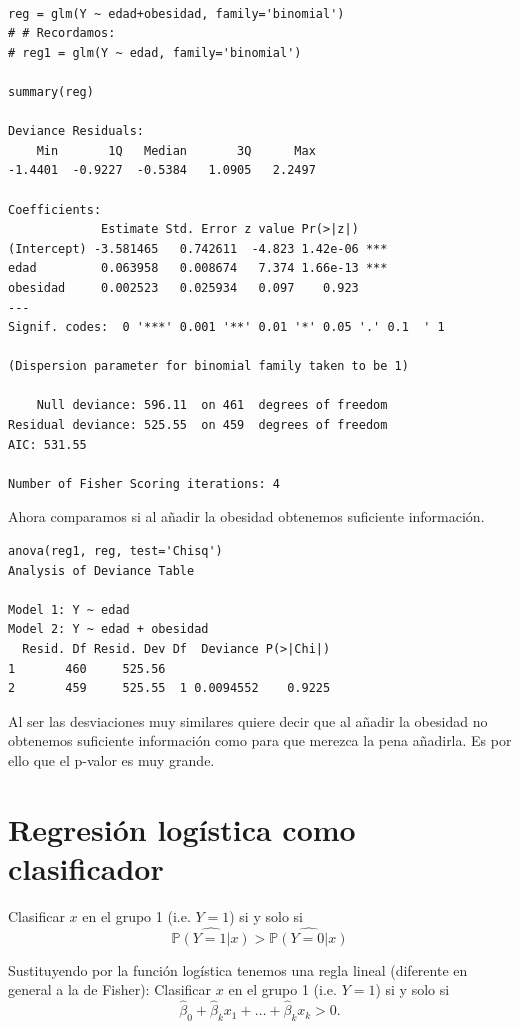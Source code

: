 \begin{lstlisting}[style=mystyle]

reg = glm(Y ~ edad+obesidad, family='binomial')
# # Recordamos:
# reg1 = glm(Y ~ edad, family='binomial')

summary(reg)

Deviance Residuals: 
    Min       1Q   Median       3Q      Max  
-1.4401  -0.9227  -0.5384   1.0905   2.2497  

Coefficients:
             Estimate Std. Error z value Pr(>|z|)    
(Intercept) -3.581465   0.742611  -4.823 1.42e-06 ***
edad         0.063958   0.008674   7.374 1.66e-13 ***
obesidad     0.002523   0.025934   0.097    0.923    
---
Signif. codes:  0 '***' 0.001 '**' 0.01 '*' 0.05 '.' 0.1  ' 1 

(Dispersion parameter for binomial family taken to be 1)

    Null deviance: 596.11  on 461  degrees of freedom
Residual deviance: 525.55  on 459  degrees of freedom
AIC: 531.55

Number of Fisher Scoring iterations: 4

\end{lstlisting}

Ahora comparamos si al añadir la obesidad obtenemos suficiente información. 

\begin{lstlisting}[style=mystyle]
anova(reg1, reg, test='Chisq')
Analysis of Deviance Table

Model 1: Y ~ edad
Model 2: Y ~ edad + obesidad
  Resid. Df Resid. Dev Df  Deviance P(>|Chi|)
1       460     525.56                       
2       459     525.55  1 0.0094552    0.9225
\end{lstlisting}

Al ser las desviaciones muy similares quiere decir que al añadir la obesidad no obtenemos suficiente información como para que merezca la pena añadirla. Es por ello que el p-valor es muy grande.

\section{Regresión logística como clasificador}

\begin{defn}
Clasificar $x$ en el grupo 1 (i.e. $Y=1$) si y solo si
\[
\widehat{\mathbb{P}(Y=1|x)}>\widehat{\mathbb{P}(Y=0|x)}
\]
\end{defn}
Sustituyendo por la función logística tenemos una regla lineal (diferente en general a la de Fisher): Clasificar $x$ en el grupo 1 (i.e. $Y=1$) si y solo si
\[
\hat\beta_0 +\hat\beta_k x_1 + \ldots + \hat\beta_k x_k > 0.
\]

